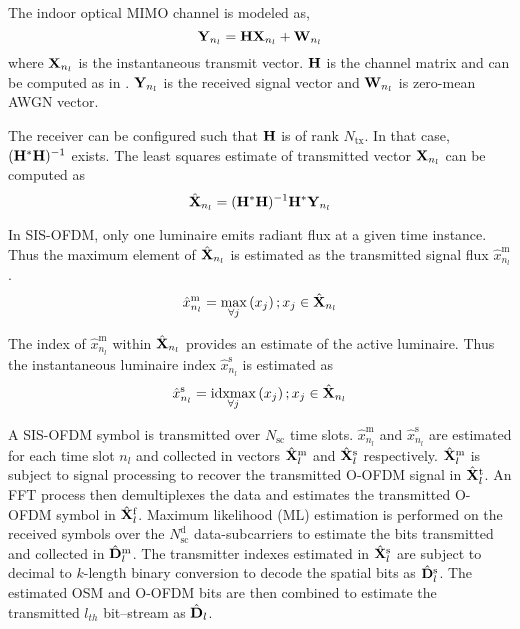 The indoor optical MIMO channel is modeled as,
\begin{equation}
	\label{eqChannel}
	{\bf{Y}}_{n_l} = {\bf{H}}{\bf{X}}_{n_l} + {\bf{W}}_{n_l}
\end{equation}
where ${\bf{X}}_{n_l}$ is the instantaneous transmit vector. ${\bf{H}}$ is the channel matrix and can be computed as in \cite{but13a}. ${\bf{Y}}_{n_l}$ is the received signal vector and ${\bf{W}}_{n_l}$ is zero-mean AWGN vector.

The receiver can be configured such that ${\bf{H}}$ is of rank $N_{\text{tx}}$. In that case, $({\bf{H}}^{*}{\bf{H}})^{-1}$ exists. The least squares estimate of transmitted vector ${\bf{X}}_{n_l}$ can be computed as
\begin{equation}
	\label{eqXls}
	\hat{{\bf{X}}}_{n_l} = ({\bf{H}}^{*}{\bf{H}})^{-1}{\bf{H}}^{*}{\bf{Y}}_{n_l}
\end{equation}

In SIS-OFDM, only one luminaire emits radiant flux at a given time instance. Thus the maximum element of $\hat{{\bf{X}}}_{n_l}$ is estimated as the transmitted signal flux $\hat{x}^{\text{m}}_{n_l}$.
\begin{equation}
	\label{eqxhsym}
	\hat{x}^{\text{m}}_{n_l} = \max_{\forall j}\left(x_{j}\right); x_{j}\in\hat{{\bf{X}}}_{n_l}
\end{equation}

The index of $\hat{x}^{\text{m}}_{n_l}$ within $\hat{{\bf{X}}}_{n_l}$ provides an estimate of the active luminaire. Thus the instantaneous luminaire index $\hat{x}^{\text{s}}_{n_l}$ is estimated as
\begin{equation}
	\label{eqxhtx}
	\hat{x}^{\text{s}}_{n_l} = \idxmax_{\forall j}\left(x_{j}\right); x_{j}\in\hat{\vm{X}}_{n_l}
\end{equation}

A SIS-OFDM symbol is transmitted over $N_{\text{sc}}$ time slots. $\hat{x}^{\text{m}}_{n_l}$ and $\hat{x}^{\text{s}}_{n_l}$ are estimated for each time slot $n_l$ and collected in vectors $\hat{{\bf{X}}}^{\text{m}}_l$ and $\hat{{\bf{X}}}^{\text{s}}_l$ respectively. $\hat{{\bf{X}}}^{\text{m}}_l$ is subject to signal processing to recover the transmitted O-OFDM signal in $\hat{{\bf{X}}}^{\text{t}}_l$. An FFT process then demultiplexes the data and estimates the transmitted O-OFDM symbol in $\hat{{\bf{X}}}^{\text{f}}_l$. Maximum likelihood (ML) estimation is performed on the received symbols over the $N_{\text{sc}}^{\text{d}}$ data-subcarriers to estimate the bits transmitted and collected in $\hat{{\bf{D}}}^{\text{m}}_l$. The transmitter indexes estimated in $\hat{{\bf{X}}}^{\text{s}}_l$ are subject to decimal to $k$-length binary conversion to decode the spatial bits as $\hat{{\bf{D}}}^{\text{s}}_l$. The estimated OSM and O-OFDM bits are then combined to estimate the transmitted $l_{th}$ bit--stream as $\hat{{\bf{D}}}_l$.

